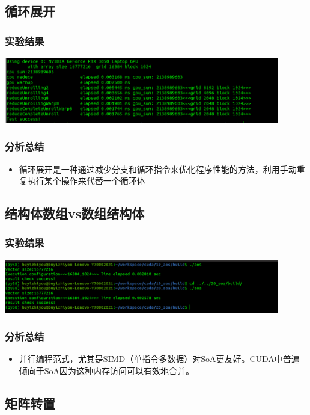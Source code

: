 \subsection{循环展开}
\subsubsection{实验结果}
\noindent
\includegraphics[width=0.9\textwidth]{assets/loop.png}
\subsubsection{分析总结}
\noindent
\begin{itemize}
	\item 循环展开是一种通过减少分支和循环指令来优化程序性能的方法，利用手动重复执行某个操作来代替一个循环体
\end{itemize}


\subsection{结构体数组vs数组结构体}
\subsubsection{实验结果}
\noindent
\includegraphics[width=0.9\textwidth]{assets/aos.png}
\subsubsection{分析总结}
\noindent
\begin{itemize}
	\item 并行编程范式，尤其是SIMD（单指令多数据）对SoA更友好。CUDA中普遍倾向于SoA因为这种内存访问可以有效地合并。
\end{itemize}


\subsection{矩阵转置}
